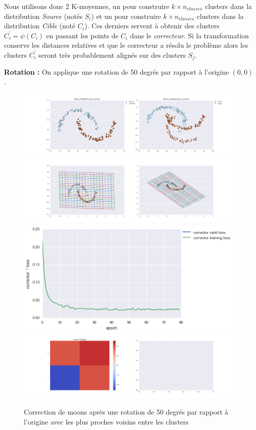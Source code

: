 Nous utilisons donc 2 K-moyennes, un pour construire $k\times n_{classes}$ clusters 
dans la distribution \emph{Source} (notés $S_i$) et un pour construire $k\times n_{classes}$ 
clusters dans la distribution \emph{Cible} (noté $C_i$). Ces derniers servent à obtenir 
des clusters $C_i^\prime = \psi(C_i)$ en passant les points de $C_i$ dans le \emph{correcteur}.
Si la transformation conserve les distances relatives et que le correcteur a résolu le problème
alors les clusters $C_i^\prime$ seront très probablement alignés sur des clusters $S_j$.

{\Large \textbf{Rotation :}} On applique une rotation de 50 degrés par rapport à l'origine $(0,0)$.

\begin{figure}[H] %
\centering
\includegraphics[width=\linewidth]{fig/24-05-2016/moons/Moons_RotatedCluster_Corrector-DATA.png}
\includegraphics[width=\linewidth]{fig/24-05-2016/moons/Moons_RotatedCluster_Corrector-GridCheck.png}
\includegraphics[width=0.45\linewidth]{fig/24-05-2016/moons/Moons_RotatedCluster_Corrector-Learning_curve.png}
\includegraphics[width=\linewidth]{fig/24-05-2016/moons/Moons_RotatedCluster_Corrector-W.png}
\caption{Correction de moons après une rotation de 50 degrés par rapport à l'origine avec les plus proches voisins entre les clusters}
\label{fig:recap-moons-rot-cluster}
\end{figure}

